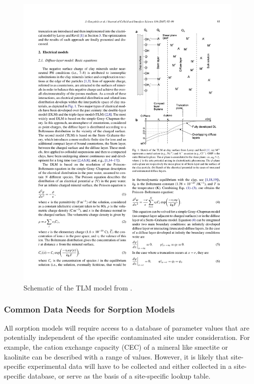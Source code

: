 \begin{enumerate}
\begin{enumerate}
\begin{figure}
\begin{center}
    \includegraphics[width=0.75\linewidth]
                    {figs/sorption/goncalves-2007-TLM-Fig-b.pdf}
  \end{center} 
  \caption{Schematic of the TLM model from \citet{goncalves-2007}.}    
  \label{fig:triple-layer-model}
\end{figure}

\end{enumerate}

\end{enumerate}

\subsubsection{Common Data Needs for Sorption Models}

All sorption models will require access to a database of parameter values that are potentially independent of the specific contaminated site under consideration.  For example, the cation exchange capacity (CEC) of a mineral like smectite or kaolinite can be described with a range of values.  However, it is likely that site-specific experimental data will have to
be collected and either collected in a site-specific database, or serve as the basis of a site-specific lookup table.


